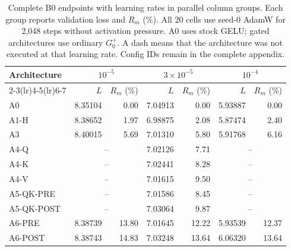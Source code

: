 \begin{table}[H]
\centering
\footnotesize
\setlength{\tabcolsep}{4.2pt}
\caption{Complete B0 endpoints with learning rates in parallel column groups. Each group reports validation loss and $R_m$ (\%). All 20 cells use seed-0 AdamW for 2,048 steps without activation pressure. A0 uses stock GELU; gated architectures use ordinary $G^+_0$. A dash means that the architecture was not executed at that learning rate. Config IDs remain in the complete appendix.}
\label{tab:b0}
\begin{tabular}{l rr rr rr}
\toprule
\multirow{2}{*}{Architecture} & \multicolumn{2}{c}{$10^{-5}$} & \multicolumn{2}{c}{$3\times10^{-5}$} & \multicolumn{2}{c}{$10^{-4}$} \\
\cmidrule(lr){2-3}\cmidrule(lr){4-5}\cmidrule(lr){6-7}
& $L$ & $R_m$ (\%) & $L$ & $R_m$ (\%) & $L$ & $R_m$ (\%) \\
\midrule
A0 & 8.35104 & 0.00 & 7.04913 & 0.00 & 5.93887 & 0.00 \\
A1-H & 8.38652 & 1.97 & 6.98875 & 2.08 & 5.87474 & 2.40 \\
A3 & 8.40015 & 5.69 & 7.01310 & 5.80 & 5.91768 & 6.16 \\
A4-Q & \multicolumn{2}{c}{--} & 7.02126 & 7.71 & \multicolumn{2}{c}{--} \\
A4-K & \multicolumn{2}{c}{--} & 7.02441 & 8.28 & \multicolumn{2}{c}{--} \\
A4-V & \multicolumn{2}{c}{--} & 7.01615 & 9.50 & \multicolumn{2}{c}{--} \\
A5-QK-PRE & \multicolumn{2}{c}{--} & 7.01586 & 8.45 & \multicolumn{2}{c}{--} \\
A5-QK-POST & \multicolumn{2}{c}{--} & 7.03064 & 9.87 & \multicolumn{2}{c}{--} \\
A6-PRE & 8.38739 & 13.80 & 7.01645 & 12.22 & 5.93539 & 12.37 \\
A6-POST & 8.38743 & 14.83 & 7.03248 & 13.64 & 6.06320 & 13.64 \\
\bottomrule
\end{tabular}
\end{table}
